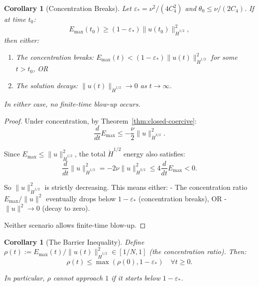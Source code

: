 \documentclass[11pt]{article}
\newtheorem{corollary}[theorem]{Corollary}
\theoremstyle{definition}
\begin{document}
\begin{corollary}[Concentration Breaks]\label{cor:concentration-breaks}
Let $\varepsilon_* = \nu^2/(4C_4^2)$ and $\theta_0 \leq \nu/(2C_4)$. If at time $t_0$:
\begin{equation}
E_{\max}(t_0) \geq (1-\varepsilon_*)\|u(t_0)\|_{\dot{H}^{1/2}}^2,
\end{equation}
then either:
\begin{enumerate}
\item The concentration breaks: $E_{\max}(t) < (1-\varepsilon_*)\|u(t)\|_{\dot{H}^{1/2}}^2$ for some $t > t_0$, OR
\item The solution decays: $\|u(t)\|_{\dot{H}^{1/2}} \to 0$ as $t \to \infty$.
\end{enumerate}
In either case, no finite-time blow-up occurs.
\end{corollary}

\begin{proof}
Under concentration, by Theorem~\ref{thm:closed-coercive}:
\begin{equation}
\frac{d}{dt}E_{\max} \leq -\frac{\nu}{2}\|u\|_{\dot{H}^{3/2}}^2.
\end{equation}

Since $E_{\max} \leq \|u\|_{\dot{H}^{1/2}}^2$, the total $\dot{H}^{1/2}$ energy also satisfies:
\begin{equation}
\frac{d}{dt}\|u\|_{\dot{H}^{1/2}}^2 = -2\nu\|u\|_{\dot{H}^{3/2}}^2 \leq 4 \frac{d}{dt}E_{\max} < 0.
\end{equation}

So $\|u\|_{\dot{H}^{1/2}}^2$ is strictly decreasing. This means either:
- The concentration ratio $E_{\max}/\|u\|^2$ eventually drops below $1-\varepsilon_*$ (concentration breaks), OR
- $\|u\|^2 \to 0$ (decay to zero).

Neither scenario allows finite-time blow-up.
\end{proof}

\begin{corollary}[The Barrier Inequality]\label{cor:barrier}
Define $\rho(t) := E_{\max}(t)/\|u(t)\|_{\dot{H}^{1/2}}^2 \in [1/N, 1]$ (the concentration ratio). Then:
\begin{equation}\label{eq:barrier}
\boxed{\rho(t) \leq \max\left(\rho(0), 1 - \varepsilon_*\right) \quad \forall t \geq 0.}
\end{equation}

In particular, $\rho$ cannot approach $1$ if it starts below $1-\varepsilon_*$.
\end{corollary}
\end{document}
